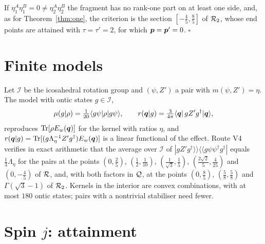If $\eta_1^A\eta_1^B=0\ne\eta_2^A\eta_2^B$ the fragment has no rank-one part on at least one side, and, as for Theorem~\ref{thm:one}, the criterion is the section $[-\tfrac45,\tfrac85]$ of $\mathcal{R}_2$, whose end points are attained with $\tau=\tau'=2$, for which $\bm{p}=\bm{p}'=0$. \hfill$\square$

\section{Finite models}
\label{app:finite}

Let $\mathcal{I}$ be the icosahedral rotation group and $(\psi,Z')$ a pair with $m(\psi,Z')=\eta$. The model with ontic states $g\in\mathcal{I}$,
\begin{equation}
\mu(g|\rho)=\tfrac{1}{20}\langle g\psi|\rho|g\psi\rangle,\qquad r(\bm{q}|g)=\tfrac{3}{4\pi}\langle\bm{q}|\,gZ'g^\dagger|\bm{q}\rangle,
\end{equation}
reproduces $\operatorname{Tr}[\rho E_w(\bm{q})]$ for the kernel with ratios $\eta$, and $r(\bm{q}|g)=\operatorname{Tr}[(g\Lambda_\eta^{-1}Z'g^\dagger)E_w(\bm{q})]$ is a linear functional of the effect. Route V4 verifies in exact arithmetic that the average over $\mathcal{I}$ of $|gZ'g^\dagger\rangle\!\rangle\langle\!\langle g\psi\psi^\dagger g^\dagger|$ equals $\tfrac13\Lambda_\eta$ for the pairs at the points $(0,\tfrac25)$, $(\tfrac12,\tfrac1{10})$, $(\tfrac1{\sqrt3},\tfrac15)$, $(\tfrac{2\sqrt2}{5},\tfrac4{25})$ and $(0,-\tfrac45)$ of $\mathcal{R}$, and, with both factors in $\mathcal{Q}$, at the points $(0,\tfrac85)$, $(\tfrac58,\tfrac58)$ and $\Gamma(\sqrt3-1)$ of $\mathcal{R}_2$. Kernels in the interior are convex combinations, with at most $180$ ontic states; pairs with a nontrivial stabiliser need fewer.

\section{Spin $j$: attainment}
\label{app:spinj}

